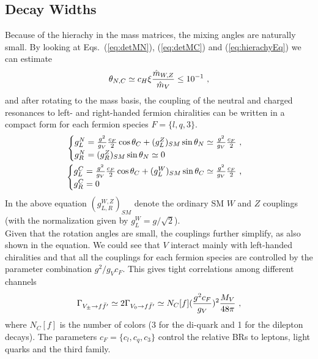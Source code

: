 \subsection*{Decay Widths}
Because of the hierachy in the mass matrices, the mixing angles are naturally small. By looking at Eqs.~(\ref{eq:detMN}), (\ref{eq:detMC}) and (\ref{eq:hierachyEq}) we can estimate
\begin{align}
  \theta_{N,C}\simeq c_{H}\xi \frac{\hat{m}_{W,Z}}{\hat{m}_{V}}\leq10^{-1}\textup{ ,}
\end{align}
and after rotating to the mass basis, the coupling of the neutral and charged resonances to left- and right-handed fermion chiralities can be written in a compact form for each fermion species $F=\{l,q,3\}$.
\begin{align}
\begin{cases}  
  g_{L}^{N}=\frac{g^{2}}{g_{V}}\frac{c_{F}}{2}\cos\theta_{C}+(g_{L}^{Z})_{SM}\sin\theta_{N}\simeq\frac{g^{2}}{g_{V}}\frac{c_{F}}{2}\textup{ ,}\\
  g_{R}^{N}=(g_{R}^{Z})_{SM}\sin\theta_{N}\simeq0
\end{cases}\nonumber\\
\begin{cases}
  g_{L}^{C}=\frac{g^{2}}{g_{V}}\frac{c_{F}}{2}\cos\theta_{C}+(g_{L}^{W})_{SM}\sin\theta_{C}\simeq\frac{g^{2}}{g_{V}}\frac{c_{F}}{2}\textup{ ,}\\
  g_{R}^{C}=0
\end{cases}
\end{align}
In the above equation $(g_{L,R}^{W,Z})_{SM}$ denote the ordinary SM $W$ and $Z$ couplings (with the normalization given by $g_{L}^{W}=g/\sqrt{2}$).\\
\newline Given that the rotation angles are small, the couplings further simplify, as also shown in the equation. We could see that $V$ interact mainly with left-handed chiralities and that all the couplings for each fermion species are controlled by the parameter combination $g^{2}/g_{V}c_{F}$. This gives tight correlations among different channels
\begin{align}
  \label{eq:DRfermion}
  \Gamma_{V_{\pm}\rightarrow f\bar{f}'}\simeq2\Gamma_{V_{0}\rightarrow f\bar{f}'}\simeq N_{C}[f](\frac{g^{2}c_{F}}{g_{V}})^{2}\frac{M_{V}}{48\pi}\textup{ ,}
\end{align}
where $N_{C}[f]$ is the number of colors (3 for the di-quark and 1 for the dilepton decays). The parameters $c_{F}=\{c_{l},c_{q},c_{3}\}$ control the relative BRs to leptons, light quarks and the third family.
